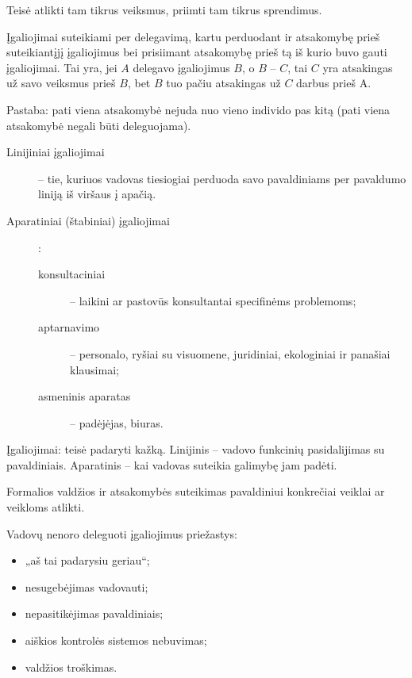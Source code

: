 \begin{defn}[Įgaliojimai]
  Teisė atlikti tam tikrus veiksmus, priimti tam tikrus sprendimus.

  Įgaliojimai suteikiami per delegavimą, kartu perduodant ir
  atsakomybę prieš suteikiantįjį įgaliojimus bei prisiimant atsakomybę
  prieš tą iš kurio buvo gauti įgaliojimai. Tai yra, jei $A$
  delegavo įgaliojimus $B$, o $B$ – $C$, tai $C$ yra atsakingas už
  savo veiksmus prieš $B$, bet $B$ tuo pačiu atsakingas už $C$ darbus
  prieš A.

  Pastaba: pati viena atsakomybė nejuda nuo vieno individo pas kitą
  (pati viena atsakomybė negali būti deleguojama).

  \begin{description}
    \item[Linijiniai įgaliojimai] – tie, kuriuos vadovas tiesiogiai
      perduoda savo pavaldiniams per pavaldumo liniją iš viršaus į
      apačią.
    \item[Aparatiniai (štabiniai) įgaliojimai]:
      \begin{description}
        \item[konsultaciniai] – laikini ar pastovūs konsultantai
          specifinėms problemoms;
        \item[aptarnavimo] – personalo, ryšiai su visuomene, juridiniai,
          ekologiniai ir panašiai klausimai;
        \item[asmeninis aparatas] – padėjėjas, biuras.
      \end{description}
  \end{description}
\end{defn}

Įgaliojimai: teisė padaryti kažką. Linijinis – vadovo funkcinių 
pasidalijimas su pavaldiniais. Aparatinis – kai vadovas suteikia
galimybę jam padėti.

\begin{defn}[Delegavimas]
  Formalios valdžios ir atsakomybės suteikimas pavaldiniui konkrečiai
  veiklai ar veikloms atlikti.
\end{defn}

Vadovų nenoro deleguoti įgaliojimus priežastys:
\begin{itemize}
  \item „aš tai padarysiu geriau“;
  \item nesugebėjimas vadovauti;
  \item nepasitikėjimas pavaldiniais;
  \item aiškios kontrolės sistemos nebuvimas;
  \item valdžios troškimas.
\end{itemize}

